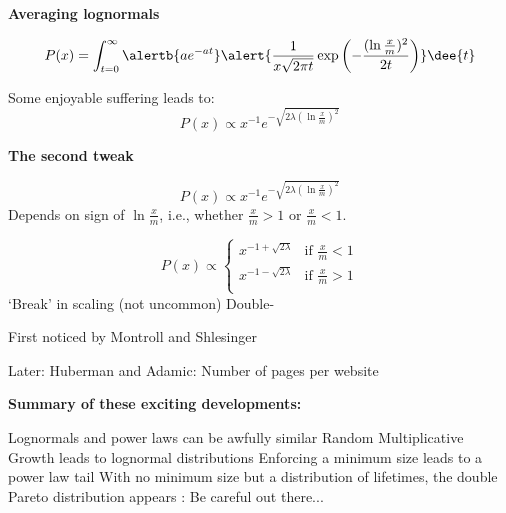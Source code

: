   


  \textbf{Averaging lognormals}

  
    
    
      $$
      P(x) = \int_{t=0}^\infty
      \alertb{a e^{-at}}
      \alert{
        \frac{1}{x \sqrt{2\pi t}}
        \exp
        \left(
          -\frac{(\ln \frac{x}{m})^2}
          {2t}
        \right)
      }
      \dee{t}
      $$
    
    
      Some enjoyable suffering leads to:
      $$
      P(x)
      \propto
      x^{-1} e^{- \sqrt{2\lambda (\ln \frac{x}{m}) ^2}} 
      $$
    
  


  \textbf{The second tweak}

  
  
   $$
    P(x)
    \propto
    x^{-1} e^{- \sqrt{2\lambda (\ln \frac{x}{m}) ^2}} 
    $$
   Depends on sign of $\ln \frac{x}{m}$, i.e., whether $\frac{x}{m}>1$ or $\frac{x}{m}<1$.
   
    $$
    P(x) 
    \propto
    \left\{
      \begin{array}{cl}
        x^{-1 + \sqrt{2\lambda}} & \mbox{if $\frac{x}{m}<1$} \\
        x^{-1 - \sqrt{2\lambda}} & \mbox{if $\frac{x}{m}>1$} \\
      \end{array}
    \right.
    $$
   \alert{`Break' in scaling} (not uncommon)
   Double-
  
    First noticed by Montroll and Shlesinger\cite{montroll1982a,montroll1983a}
   
    Later: Huberman and Adamic\cite{huberman1999a,huberman2000a}: Number of pages per website
  
  


  \textbf{Summary of these exciting developments:}
  
  
  
   Lognormals and power laws can be \alert{awfully} similar
   Random Multiplicative Growth leads to lognormal distributions
   Enforcing a minimum size leads to a power law tail
   With no minimum size but a distribution of lifetimes, 
    the double Pareto distribution appears
   : Be careful out there...
  
  
  

